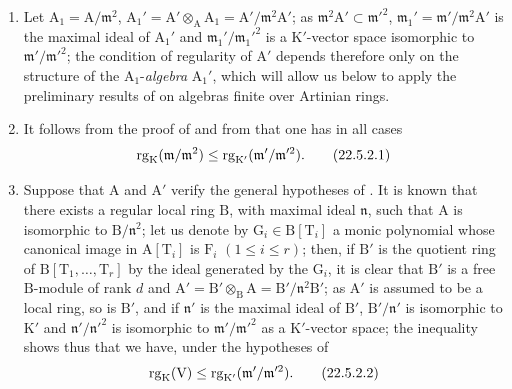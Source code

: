 \begin{remark}[22.5.2]
\label{0.22.5.2}
\begin{enumerate}
  \item[\rm{(i)}] Let $\mathrm{A}_1=\mathrm{A}/\mathfrak{m}^2$, $\mathrm{A}_1'=\mathrm{A}'\otimes_\mathrm{A}\mathrm{A}_1=\mathrm{A}'/\mathfrak{m}^2\mathrm{A}'$; as $\mathfrak{m}^2\mathrm{A}'\subset\mathfrak{m}'^2$, $\mathfrak{m}_1'=\mathfrak{m}'/\mathfrak{m}^2\mathrm{A}'$ is the maximal ideal of $\mathrm{A}_1'$ and $\mathfrak{m}_1'/\mathfrak{m}_1'^2$ is a $\mathrm{K}'$-vector space isomorphic to $\mathfrak{m}'/\mathfrak{m}'^2$; the condition of regularity of $\mathrm{A}'$ depends therefore only on the structure of the $\mathrm{A}_1$-\emph{algebra} $\mathrm{A}_1'$, which will allow us below to apply the preliminary results of  on algebras finite over Artinian rings.
  \item[\rm{(ii)}] It follows from the proof of  and from  that one has in all cases
\[
\label{0.22.5.2.1}
  \operatorname{rg}_\mathrm{K}(\mathfrak{m}/\mathfrak{m}^2)\leq\operatorname{rg}_{\mathrm{K}'}(\mathfrak{m}'/\mathfrak{m}'^2).
  \tag{22.5.2.1}
\]
  \item[\rm{(iii)}] Suppose that $\mathrm{A}$ and $\mathrm{A}'$ verify the general hypotheses of .
  It is known  that there exists a regular local ring $\mathrm{B}$, with maximal ideal $\mathfrak{n}$, such that $\mathrm{A}$ is isomorphic to $\mathrm{B}/\mathfrak{n}^2$; let us denote by $\mathrm{G}_i\in\mathrm{B}[\mathrm{T}_i]$ a monic polynomial whose canonical image in $\mathrm{A}[\mathrm{T}_i]$ is $\mathrm{F}_i$ $(1\leq i\leq r)$; then, if $\mathrm{B}'$ is the quotient ring of $\mathrm{B}[\mathrm{T}_1,\ldots,\mathrm{T}_r]$ by the ideal generated by the $\mathrm{G}_i$, it is clear that $\mathrm{B}'$ is a free $\mathrm{B}$-module of rank $d$ and $\mathrm{A}'=\mathrm{B}'\otimes_\mathrm{B}\mathrm{A}=\mathrm{B}'/\mathfrak{n}^2\mathrm{B}'$; as $\mathrm{A}'$ is assumed to be a local ring, so is $\mathrm{B}'$, and if $\mathfrak{n}'$ is the maximal ideal of $\mathrm{B}'$, $\mathrm{B}'/\mathfrak{n}'$ is isomorphic to $\mathrm{K}'$ and $\mathfrak{n}'/\mathfrak{n}'^2$ is isomorphic to $\mathfrak{m}'/\mathfrak{m}'^2$ as a $\mathrm{K}'$-vector space;
  the inequality  shows thus that we have, under the hypotheses of 
\[
\label{0.22.5.2.2}
  \operatorname{rg}_\mathrm{K}(\mathrm{V})\leq\operatorname{rg}_{\mathrm{K}'}(\mathfrak{m}'/\mathfrak{m}'^2).
  \tag{22.5.2.2}
\]
\end{enumerate}
\end{remark}

